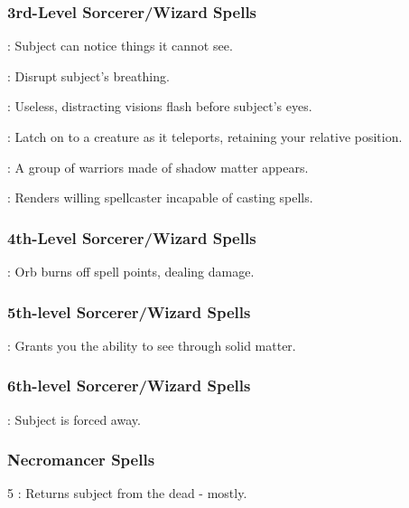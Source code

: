\subsubsection{3rd-Level Sorcerer/Wizard Spells}
\begin{list}{}{\leftmargin=1em}
 \item {}: Subject can notice things it cannot see.
 \item {}: Disrupt subject's breathing.
 \item {}: Useless, distracting visions flash before subject's eyes.
 \item {}: Latch on to a creature as it teleports, retaining your relative position.
 \item {}: A group of warriors made of shadow matter appears.
 \item {}: Renders willing spellcaster incapable of casting spells.
\end{list}
\subsubsection{4th-Level Sorcerer/Wizard Spells}
\begin{list}{}{\leftmargin=1em}
 \item {}: Orb burns off spell points, dealing damage.
\end{list}
\subsubsection{5th-level Sorcerer/Wizard Spells}
\begin{list}{}{\leftmargin=1em} 
 \item {}: Grants you the ability to see through solid matter.
\end{list}
\subsubsection{6th-level Sorcerer/Wizard Spells}
\begin{list}{}{\leftmargin=1em}
 \item {}: Subject is forced away.
\end{list}

\subsubsection{Necromancer Spells}
\begin{list}{}{\leftmargin=1em}
 \item[5] : Returns subject from the dead - mostly.
\end{list}

